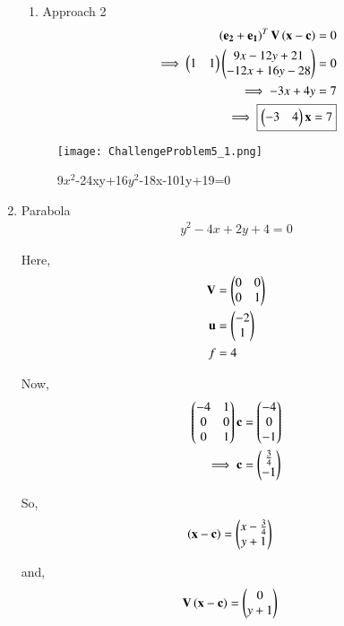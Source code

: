\documentclass[journal,12pt,twocolumn]{IEEEtran}
\begin{document}
\begin{enumerate}
\begin{enumerate}
    \item Approach 2
    \begin{align}
    \left(\mathbf{e_2} + \mathbf{e_1}\right)^T\mathbf{V}\left(\mathbf{x}-\mathbf{c}\right) = 0\\
    \implies \begin{pmatrix}1 & 1\end{pmatrix}\begin{pmatrix}9x-12y+21 \\ -12x+16y-28\end{pmatrix} = 0
    \\
    \implies -3x + 4y = 7 \\
    \implies \boxed{\begin{pmatrix}-3 & 4\end{pmatrix}\mathbf{x} = 7}
    \end{align}
    \end{enumerate}
    
    \begin{figure}[!ht]
    \centering
    \texttt{[image: ChallengeProblem5\_1.png]}
    \caption{9$x^2$-24xy+16$y^2$-18x-101y+19=0}
    \label{ex1}	
    \end{figure}
    
    \item Parabola
    \begin{align}
    y^2-4x+2y+4 = 0
    \end{align}
    
    Here,
    \begin{align}
    \mathbf{V} &= \begin{pmatrix}0 & 0 \\ 0 & 1\end{pmatrix} \\
    \mathbf{u} &= \begin{pmatrix}-2 \\ 1\end{pmatrix} \\
    f &= 4
    \end{align}

    Now,
    \begin{align}
    \begin{pmatrix}-4 & 1 \\ 0 & 0 \\ 0 & 1\end{pmatrix}\mathbf{c} &= \begin{pmatrix}-4 \\ 0 \\ -1\end{pmatrix}
    \\
    \implies \mathbf{c} &= \begin{pmatrix}\frac{3}{4} \\ -1\end{pmatrix}
    \end{align}

    So,
    \begin{align}
    \left(\mathbf{x}-\mathbf{c}\right) &= \begin{pmatrix}x-\frac{3}{4} \\  y+1\end{pmatrix}
    \end{align}

    and,
    \begin{align}
    \mathbf{V}\left(\mathbf{x}-\mathbf{c}\right) &= \begin{pmatrix}0 \\ y+1\end{pmatrix}
    \end{align}
    

\end{enumerate}
\end{document}
